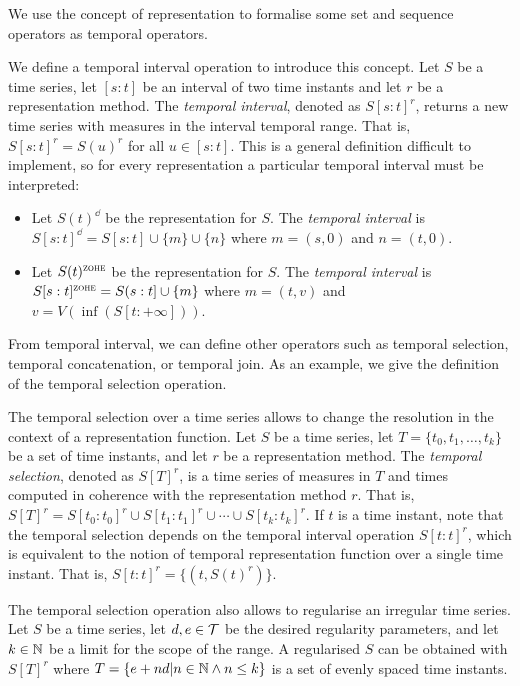We use the concept of representation to formalise some set and
sequence operators as temporal operators.

We define a temporal interval operation to introduce this concept.
Let $S$ be a time series, let $[s:t]$ be an interval of two time
instants and let $r$ be a representation method. The \emph{temporal
  interval}, denoted as $S[s:t]^r$, returns a new time series with
measures in the interval temporal range. That is, $S[s:t]^r = S(u)^r$
for all $u \in [s:t]$. This is a general definition difficult to
implement, so for every representation a particular temporal interval
must be interpreted:

\begin{itemize}
\item Let $S(t)^\dd$ be the \dd{} representation for $S$. The
  \emph{\dd{} temporal interval} is $S[s:t]^\dd = S[s:t]
  \cup \{m\} \cup \{n\}$ where $m=(s,0)$ and $n=(t,0)$.

\item Let $S(t)^\zohe{}$ be the \zohe{} representation for $S$. The
  \emph{\zohe{} temporal interval} is $S[s:t]^\zohe{} = S(s:t]
  \cup \{m\}$ where $m=(t,v)$ and $v= V(\inf( S[t:+\infty] ))$.
\end{itemize}



From temporal interval, we can define other operators such as temporal
selection, temporal concatenation, or temporal join. As an example, we
give the definition of the temporal selection operation.

The temporal selection over a time series allows to change the
resolution in the context of a representation function.  Let $S$ be a
time series, let $T=\{t_0,t_1,\dotsc,t_k\}$ be a set of time instants,
and let $r$ be a representation method. The \emph{temporal selection},
denoted as $S[T]^r$, is a time series of measures in $T$ and times
computed in coherence with the representation method $r$. That is,
$S[T]^r = S[t_0:t_0]^r \cup S[t_1:t_1]^r \cup \dotsb \cup
S[t_k:t_k]^r$. If $t$ is a time instant, note that the temporal
selection depends on the temporal interval operation $S[t:t]^r$, which
is equivalent to the notion of temporal representation function over a
single time instant. That is, $S[t:t]^r = \{ (t, S(t)^r) \}$.

The temporal selection operation also allows to regularise an
irregular time series. Let $S$ be a time series, let $d,e\in\cal{T}$
be the desired regularity parameters, and let $k\in\mathbb{N}$ be a limit for
the scope of the range.  A regularised $S$ can be obtained with
$S[T]^r$ where $T = \{e+nd | n\in\mathbb{N} \wedge n\leq k \}$ is a set of
evenly spaced time instants.


